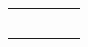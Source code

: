 \documentclass[11pt,twoside,a4paper]{article}
\begin{document}
\begin{multicols}{2}
\begin{tabular}{ p{} c c c}
		\vfill~\\ %
		
	\end{tabular}
\end{multicols}
\end{document}
